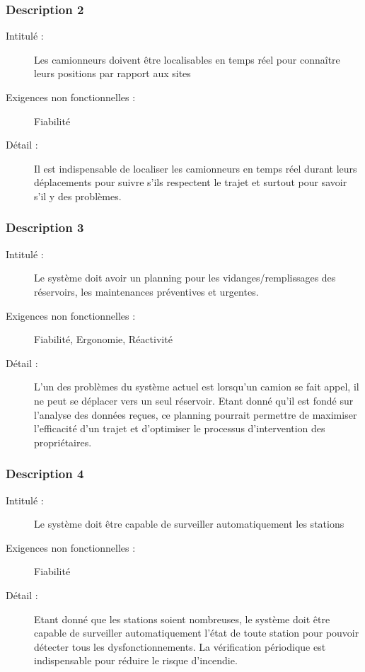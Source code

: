 \subsubsection {Description 2}
\begin{description}
           \item[Intitulé :] Les camionneurs doivent être localisables en temps réel pour connaître leurs positions par rapport aux sites 
           \item[Exigences non fonctionnelles :] Fiabilité
           \item[Détail :] Il est indispensable de localiser les camionneurs en temps réel durant leurs déplacements pour suivre s’ils respectent le trajet et surtout pour savoir s’il y des problèmes.
\end{description}

\subsubsection {Description 3}
\begin{description}
           \item[Intitulé :] Le système doit avoir un planning pour les vidanges/remplissages des réservoirs, les maintenances préventives et urgentes. 
           \item[Exigences non fonctionnelles :] Fiabilité, Ergonomie, Réactivité
           \item[Détail :] L’un des problèmes du système actuel est lorsqu’un camion se fait appel, il ne peut se déplacer vers un seul réservoir. Etant  donné qu’il est fondé sur l’analyse des données reçues, ce planning pourrait permettre de maximiser l’efficacité d’un trajet et d’optimiser le processus d’intervention des propriétaires. 
\end{description}

\subsubsection {Description 4}
\begin{description}
           \item[Intitulé :] Le système doit être capable de surveiller automatiquement les stations 
           \item[Exigences non fonctionnelles :] Fiabilité
           \item[Détail :] Etant donné que les stations soient nombreuses, le système doit être capable de surveiller automatiquement  l’état de toute station pour pouvoir détecter tous les dysfonctionnements.  La vérification périodique est indispensable pour réduire le risque d’incendie.  
\end{description}

